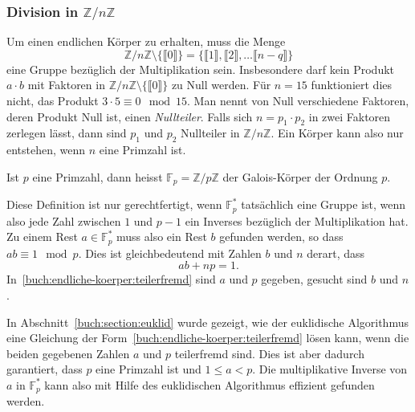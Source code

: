 \subsubsection{Division in $\mathbb{Z}/n\mathbb{Z}$}
Um einen endlichen Körper zu erhalten, muss die Menge
\[
\mathbb{Z}/n\mathbb{Z} \setminus \{\llbracket0\rrbracket\}
=
\{
\llbracket 1\rrbracket,
\llbracket 2\rrbracket,
\dots
\llbracket n-q\rrbracket
\}
\]
eine Gruppe bezüglich der Multiplikation sein.
Insbesondere darf kein Produkt $a\cdot b$ mit Faktoren in 
$\mathbb{Z}/n\mathbb{Z} \setminus \{\llbracket0\rrbracket\}$
zu Null werden.
Für $n=15$ funktioniert dies nicht, das Produkt $3\cdot 5\equiv 0\mod 15$.
Man nennt von Null verschiedene Faktoren, deren Produkt Null ist, einen
{\em Nullteiler}.
Falls sich $n=p_1\cdot p_2$ in zwei Faktoren zerlegen lässt, dann sind
$p_1$ und $p_2$ Nullteiler in $\mathbb{Z}/n\mathbb{Z}$.
Ein Körper kann also nur entstehen, wenn $n$ eine Primzahl ist.

\begin{definition}
Ist $p$ eine Primzahl, dann heisst $\mathbb{F}_p=\mathbb{Z}/p\mathbb{Z}$
der Galois-Körper der Ordnung $p$.
\end{definition}

Diese Definition ist nur gerechtfertigt, wenn $\mathbb{F}_p^*$ tatsächlich
eine Gruppe ist, wenn also jede Zahl zwischen $1$ und $p-1$ ein Inverses
bezüglich der Multiplikation hat.
Zu einem Rest $a\in\mathbb{F}_p^*$ muss also ein Rest $b$ gefunden werden,
so dass $ab\equiv 1\mod p$.
Dies ist gleichbedeutend mit Zahlen $b$ und $n$ derart, dass
\begin{equation}
ab+np=1.
\label{buch:endliche-koerper:teilerfremd}
\end{equation}
In~\eqref{buch:endliche-koerper:teilerfremd} sind $a$ und $p$ gegeben,
gesucht sind $b$ und $n$.

In Abschnitt~\ref{buch:section:euklid} wurde gezeigt, wie der euklidische
Algorithmus eine Gleichung der Form~\eqref{buch:endliche-koerper:teilerfremd}
lösen kann, wenn die beiden gegebenen Zahlen $a$ und $p$ teilerfremd sind.
Dies ist aber dadurch garantiert, dass $p$ eine Primzahl ist und $1\le a <p$.
Die multiplikative Inverse von $a$ in $\mathbb{F}_p^*$ kann also mit
Hilfe des euklidischen Algorithmus effizient gefunden werden.


